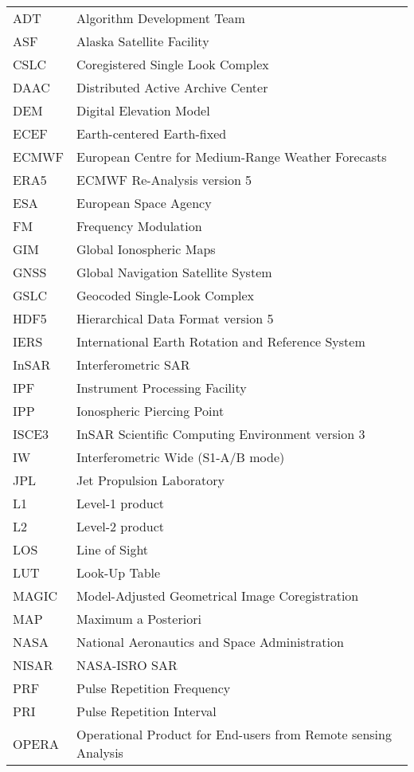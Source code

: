 \begin{longtable}{ll}
ADT & Algorithm Development Team \\
ASF & Alaska Satellite Facility \\
CSLC & Coregistered Single Look Complex \\
DAAC & Distributed Active Archive Center \\
DEM & Digital Elevation Model \\
ECEF & Earth-centered Earth-fixed \\
ECMWF & European Centre for Medium-Range Weather Forecasts \\
ERA5 & ECMWF Re-Analysis version 5 \\
ESA & European Space Agency \\
FM & Frequency Modulation \\
GIM & Global Ionospheric Maps \\
GNSS & Global Navigation Satellite System \\
GSLC & Geocoded Single-Look Complex \\
HDF5 & Hierarchical Data Format version 5 \\
IERS & International Earth Rotation and Reference System  \\
InSAR & Interferometric SAR \\
IPF & Instrument Processing Facility \\
IPP & Ionospheric Piercing Point \\
ISCE3 & InSAR Scientific Computing Environment version 3 \\
IW & Interferometric Wide (S1-A/B mode) \\
JPL & Jet Propulsion Laboratory \\
L1 & Level-1 product \\
L2 & Level-2 product \\
LOS & Line of Sight \\
LUT & Look-Up Table \\
MAGIC & Model-Adjusted Geometrical Image Coregistration \\
MAP & Maximum a Posteriori \\
NASA & National Aeronautics and Space Administration \\
NISAR & NASA-ISRO SAR \\
PRF & Pulse Repetition Frequency \\
PRI  & Pulse Repetition Interval \\
OPERA & Operational Product for End-users from Remote sensing Analysis \\

\end{longtable}
